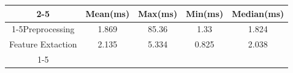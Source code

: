 \documentclass{standalone}
\begin{document}
 
 \begin{tabular}{|c |c |c |c |c |}
\cline{2-5}\cline{2-5} \multicolumn{1}{c |}{ } & Mean(ms) & Max(ms) & Min(ms) & Median(ms)\\ 
\cline{1-5}Preprocessing & 1.869 & 85.36 & 1.33 & 1.824\\ 
 \hhline{|=|=|=|=|=|}Feature Extaction & 2.135 & 5.334 & 0.825 & 2.038\\ 
 \cline{1-5}\hline \end{tabular}
 
\end{document}
